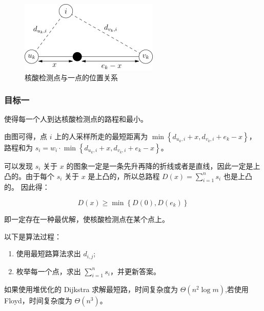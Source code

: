 \documentclass{cumcmthesis}
\begin{document}
\begin{figure}[H]
    \centering
    \includegraphics{images/Single-1}
    \caption{核酸检测点与一点的位置关系}
    \label{fig:Single-1}
\end{figure}

\subsubsection{目标一}

使得每一个人到达核酸检测点的路程和最小。

由图可得，点 $i$ 上的人采样所走的最短距离为 $\min\left\{d_{u_k,i}+x,d_{v_k,i}+e_k-x\right\}$，路程和为 $s_i=w_i\cdot\min\left\{d_{u_k,i}+x,d_{v_k,i}+e_k-x\right\}$。

可以发现 $s_i$ 关于 $x$ 的图象一定是一条先升再降的折线或者是直线，因此一定是上凸的。由于每个 $s_i$ 关于 $x$ 是上凸的，所以总路程 $D(x)=\sum_{i=1}^n s_i$ 也是上凸的。
因此得：

\begin{equation*}
    D(x)\ge\min\left\{D(0),D(e_k)\right\}
\end{equation*}

即一定存在一种最优解，使核酸检测点在某个点上。



以下是算法过程：

\begin{enumerate}
    \item 使用最短路算法求出 $d_{i,j}$;
    \item 枚举每一个点，求出 $\sum_{i=1}^n s_i$，并更新答案。
\end{enumerate}

如果使用堆优化的 Dijkstra 求解最短路，时间复杂度为 $\Theta(n^2\log m)$,若使用 Floyd，时间复杂度为 $\Theta(n^3)$。
\end{document}
